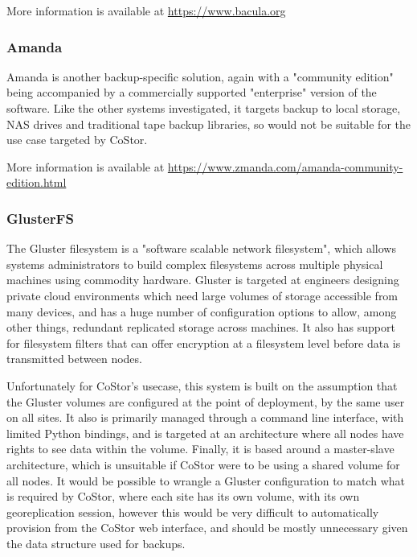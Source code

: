 \documentclass[bsc,frontabs,twoside,singlespacing,parskip,deptreport]{infthesis}     %
\begin{document}
More information is available at \url{https://www.bacula.org} \cite{bacula}

\subsubsection{Amanda}

Amanda is another backup-specific solution, again with a "community edition" being accompanied
by a commercially supported "enterprise" version of the software. Like the other systems 
investigated, it targets backup to local storage, NAS drives and traditional tape backup
libraries, so would not be suitable for the use case targeted by CoStor.

More information is available at \url{https://www.zmanda.com/amanda-community-edition.html} \cite{zmanda}

\subsubsection{GlusterFS}

The Gluster filesystem is a "software scalable network filesystem"\cite{gluster}, which 
allows systems administrators to build complex filesystems across multiple physical machines
using commodity hardware. Gluster is targeted at engineers designing private cloud environments
which need large volumes of storage accessible from many devices, and has a huge number of 
configuration options to allow, among other things, redundant replicated storage across machines.
It also has support for filesystem filters that can offer encryption at a filesystem level before
data is transmitted between nodes.

Unfortunately for CoStor's usecase, this system is built on the assumption that the Gluster 
volumes are configured at the point of deployment, by the same user on all sites. It also is
primarily managed through a command line interface, with limited Python bindings, and is targeted
at an architecture where all nodes have rights to see data within the volume. Finally, it is
based around a master-slave architecture, which is unsuitable if CoStor were to be using a shared
volume for all nodes. It would be possible to wrangle a Gluster configuration to match what is
required by CoStor, where each site has its own volume, with its own georeplication session, 
however this would be very difficult to automatically provision from the CoStor web interface, 
and should be mostly unnecessary given the data structure used for backups.
\end{document}

